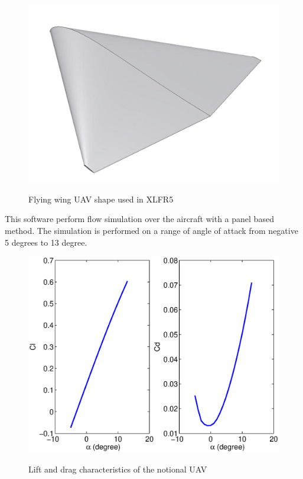\begin{figure}[ht]
  \begin{center}
    \scalebox{0.5}            %
    {\includegraphics{./Figures/UAV.png}}
  \end{center}
  \caption{Flying wing UAV shape used in XLFR5}
  \label{fig:UAV}
\end{figure}

\par This software perform flow simulation over the aircraft with a panel based method. 
The simulation is performed on a range of angle of attack from negative 5 degrees to 13 degree.

\begin{figure}[ht]
  \begin{center}
    \scalebox{0.8}
    {\includegraphics{./Figures/Cd_and_Cl_UAV.eps}}
  \end{center}
  \caption{Lift and drag characteristics of the notional UAV}
  \label{fig:Cd_and_Cl_UAV}
\end{figure}

